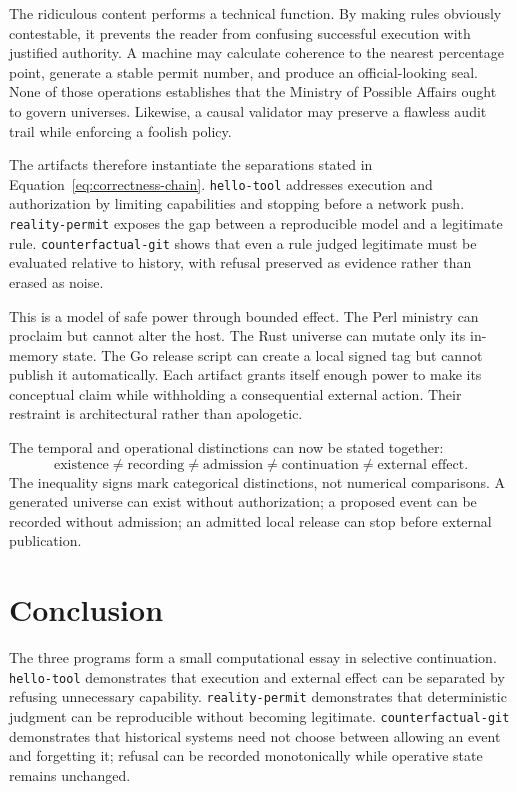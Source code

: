 \documentclass[11pt]{article}
\begin{document}
The ridiculous content performs a technical function. By making rules obviously contestable, it prevents the reader from confusing successful execution with justified authority. A machine may calculate coherence to the nearest percentage point, generate a stable permit number, and produce an official-looking seal. None of those operations establishes that the Ministry of Possible Affairs ought to govern universes. Likewise, a causal validator may preserve a flawless audit trail while enforcing a foolish policy.

The artifacts therefore instantiate the separations stated in Equation~\ref{eq:correctness-chain}. \texttt{hello-tool} addresses execution and authorization by limiting capabilities and stopping before a network push. \texttt{reality-permit} exposes the gap between a reproducible model and a legitimate rule. \texttt{counterfactual-git} shows that even a rule judged legitimate must be evaluated relative to history, with refusal preserved as evidence rather than erased as noise.

This is a model of safe power through bounded effect. The Perl ministry can proclaim but cannot alter the host. The Rust universe can mutate only its in-memory state. The Go release script can create a local signed tag but cannot publish it automatically. Each artifact grants itself enough power to make its conceptual claim while withholding a consequential external action. Their restraint is architectural rather than apologetic.

The temporal and operational distinctions can now be stated together:
\begin{equation}
  \boxed{\text{existence}\neq\text{recording}\neq\text{admission}
  \neq\text{continuation}\neq\text{external effect}}.
  \label{eq:temporal-chain}
\end{equation}
The inequality signs mark categorical distinctions, not numerical comparisons. A generated universe can exist without authorization; a proposed event can be recorded without admission; an admitted local release can stop before external publication.

\section{Conclusion}

The three programs form a small computational essay in selective continuation. \texttt{hello-tool} demonstrates that execution and external effect can be separated by refusing unnecessary capability. \texttt{reality-permit} demonstrates that deterministic judgment can be reproducible without becoming legitimate. \texttt{counterfactual-git} demonstrates that historical systems need not choose between allowing an event and forgetting it; refusal can be recorded monotonically while operative state remains unchanged.
\end{document}
